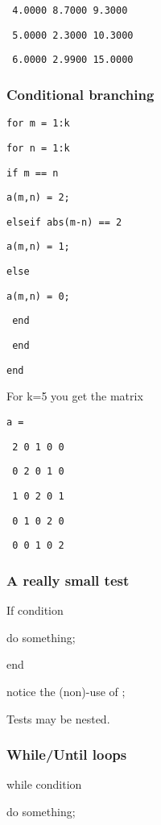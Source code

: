 \documentclass[12pt,a4paper]{article}
\begin{document}
\texttt{\ 4.0000 8.7000 9.3000}

\texttt{\ 5.0000 2.3000 10.3000}

\texttt{\ 6.0000 2.9900 15.0000}

\subsubsection{Conditional branching}

\bigskip

\texttt{for m = 1:k}

\qquad \texttt{for n = 1:k}

\qquad \qquad \texttt{if m == n}

\qquad \qquad \qquad \texttt{a(m,n) = 2;}

\qquad \qquad \texttt{elseif abs(m-n) == 2}

\qquad \qquad \qquad \texttt{a(m,n) = 1;}

\qquad \qquad \texttt{else}

\qquad \qquad \qquad \texttt{a(m,n) = 0;}

\texttt{\ \qquad \qquad end}

\texttt{\ \qquad end}

\texttt{end}

For k=5 you get the matrix

\texttt{a =}

\texttt{\ 2 0 1 0 0}

\texttt{\ 0 2 0 1 0}

\texttt{\ 1 0 2 0 1}

\texttt{\ 0 1 0 2 0}

\texttt{\ 0 0 1 0 2}

\subsubsection{A really small test}

If condition

\qquad do something;

end

notice the (non)-use of ;

Tests may be nested.

\subsubsection{While/Until loops}

while condition

\qquad do something;
\end{document}
